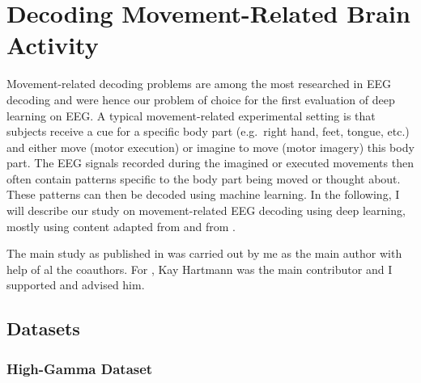 \chapter{Decoding Movement-Related Brain Activity}\label{movement-related}

    Movement-related decoding problems are among the most researched in EEG
decoding and were hence our problem of choice for the first evaluation
of deep learning on EEG. A typical movement-related experimental setting
is that subjects receive a cue for a specific body part (e.g.~right
hand, feet, tongue, etc.) and either move (motor execution) or imagine
to move (motor imagery) this body part. The EEG signals recorded during
the imagined or executed movements then often contain patterns specific
to the body part being moved or thought about. These patterns can then
be decoded using machine learning. In the following, I will describe our
study on movement-related EEG decoding using deep learning, mostly using
content adapted from \citet{schirrmeisterdeephbm2017} and
from \citep{hartmann2018hierarchical}. 

The main study as published in \citet{schirrmeisterdeephbm2017} was carried out
by me as the main author with help of al the coauthors. For
\citet{hartmann2018hierarchical}, Kay Hartmann was the main
contributor and I supported and advised him.

\section{Datasets}\label{datasets}

\subsection{High-Gamma Dataset}\label{high-gamma-dataset}

